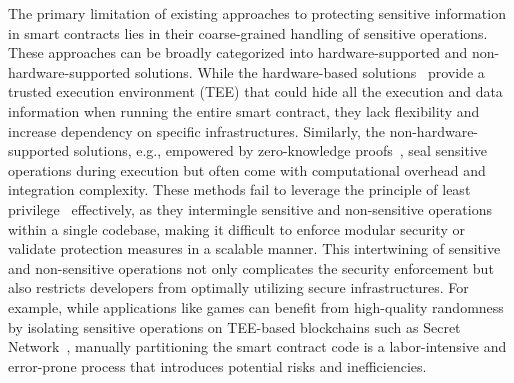 The primary limitation of existing approaches to protecting sensitive information in smart contracts lies in their coarse-grained handling of sensitive operations.
{These approaches can be broadly categorized into hardware-supported and non-hardware-supported solutions.
While the hardware-based solutions~\cite{cheng2019ekiden, russinovich2019ccf, yan2020confidentiality, xiao2020privacyguard, yuan2018shadoweth, yin2019phala} provide a trusted execution environment (TEE) that could hide all the execution and data information when running the entire smart contract, they lack flexibility and increase dependency on specific infrastructures. }
Similarly, the non-hardware-supported solutions, e.g., empowered by zero-knowledge proofs~\cite{kosba2016hawk, bunz2020zether}, seal sensitive operations during execution but often come with computational overhead and integration complexity. These methods fail to leverage the principle of least privilege~\cite{saltzer1975protection} effectively, as they intermingle sensitive and non-sensitive operations within a single codebase, making it difficult to enforce modular security or validate protection measures in a scalable manner.
This intertwining of sensitive and non-sensitive operations not only complicates the security enforcement but also restricts developers from optimally utilizing secure infrastructures. For example, while applications like games can benefit from high-quality randomness by isolating sensitive operations on TEE-based blockchains such as Secret Network~\cite{scrt}, manually partitioning the smart contract code is a labor-intensive and error-prone process that introduces potential risks and inefficiencies.

